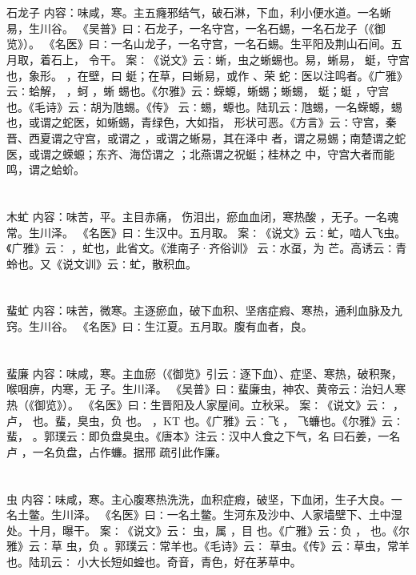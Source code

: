 \documentclass[12pt,UTF8]{ctexbook}
\begin{document}
\section{}石龙子
内容：味咸，寒。主五癃邪结气，破石淋，下血，利小便水道。一名蜥易，生川谷。 
《吴普》曰∶石龙子，一名守宫，一名石蜴，一名石龙子（《御览》）。 
《名医》曰∶一名山龙子，一名守宫，一名石蜴。生平阳及荆山石间。五月取，着石上， 
令干。 
案∶《说文》云∶蜥，虫之蜥蜴也。易，蜥易， 蜓，守宫也，象形。 ，在壁，曰 
蜓；在草，曰蜥易，或作 、荣 蛇∶医以注鸣者。《广雅》云∶蛤解， ，蚵 ，蜥 
蜴也。《尔雅》云∶蝾螈，蜥蜴；蜥蜴， 蜓；蜓 ，守宫也。《毛诗》云∶胡为虺蜴。《传》 
云∶蜴，螈也。陆玑云∶虺蜴，一名蝾螈，蜴也，或谓之蛇医，如蜥蜴，青绿色，大如指， 
形状可恶。《方言》云∶守宫，秦晋、西夏谓之守宫，或谓之 ，或谓之蜥易，其在泽中 
者，谓之易蜴；南楚谓之蛇医，或谓之蝾螈；东齐、海岱谓之 ；北燕谓之祝蜓；桂林之 
中，守宫大者而能鸣，谓之蛤蚧。 


\section{}木虻
内容：味苦，平。主目赤痛， 伤泪出，瘀血血闭，寒热酸 ，无子。一名魂常。生川泽。 
《名医》曰∶生汉中。五月取。 
案∶《说文》云∶虻，啮人飞虫。《广雅》云∶ ，虻也，此省文。《淮南子·齐俗训》 
云∶水虿，为 芒。高诱云∶青蛉也。又《说文训》云∶虻，散积血。 


\section{}蜚虻
内容：味苦，微寒。主逐瘀血，破下血积、坚痞症瘕、寒热，通利血脉及九窍。生川谷。 
《名医》曰∶生江夏。五月取。腹有血者，良。 


\section{}蜚廉
内容：味咸，寒。主血瘀（《御览》引云∶逐下血）、症坚、寒热，破积聚，喉咽痹，内寒，无 
子。生川泽。 
《吴普》曰∶蜚廉虫，神农、黄帝云∶治妇人寒热（《御览》）。 
《名医》曰∶生晋阳及人家屋间。立秋采。 
案∶《说文》云∶ ，卢， 也。蜚，臭虫，负 也。 ，KT 也。《广雅》云∶飞 
， 
飞蠊也。《尔雅》云∶蜚， 。郭璞云∶即负盘臭虫。《唐本》注云∶汉中人食之下气，名 
曰石姜，一名卢 ，一名负盘，占作蠊。据邢 疏引此作廉。 


\section{}虫
内容：味咸，寒。主心腹寒热洗洗，血积症瘕，破坚，下血闭，生子大良。一名土鳖。生川泽。 
《名医》曰∶一名土鳖。生河东及沙中、人家墙壁下、土中湿处。十月，曝干。 
案∶《说文》云∶ 虫，属 ，目 也。《广雅》云∶负 ， 也。《尔雅》云∶草 
虫，负 。郭璞云∶常羊也。《毛诗》云∶ 草虫。《传》云∶草虫，常羊也。陆玑云∶ 
小大长短如蝗也。奇音，青色，好在茅草中。 
\end{document}
